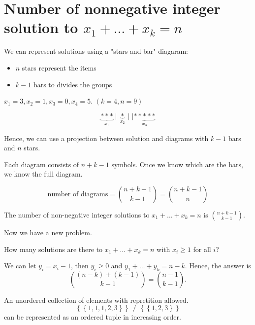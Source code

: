 \section{Number of nonnegative integer solution to \(x_1 + \dots + x_k = n\)}
We can represent solutions using a "stars and bar" diagaram:
\begin{itemize}
    \item \(n\) stars represent the items 
    \item \(k-1\) bars to divides the groups  
\end{itemize}
\begin{eg}
    \(x_1 = 3, x_2 = 1, x_3 = 0, x_4 = 5\). \((k=4, n=9)\)  
\end{eg}
\begin{explanation}
    \[
        \underbrace{* * *}_{x_1} \mid \underbrace{*}_{x_2} \mid \mid \underbrace{* * * * *}_{x_3}
    \]
\end{explanation}

Hence, we can use a projection between solution and diagrams with \(k-1\) bars and \(n\) stars. 

Each diagram consists of \(n + k - 1\) symbols. Once we know which are the bars, we know the full diagram. 

\[
    \text{number of diagrams} = \binom{n + k - 1}{k - 1} = \binom{n + k - 1}{n}
\]

\begin{proposition}
    The number of non-negative integer solutions to \(x_1 + \dots + x_k = n\) is \(\binom{n + k - 1}{k - 1}\). 
\end{proposition}
Now we have a new problem. 
\begin{question}
    How many solutions are there to \(x_1 + \dots + x_k = n\) with \(x_i \ge 1\) for all \(i\)?
\end{question}

We can let \(y_i = x_i - 1\), then \(y_i \ge 0\) and \(y_1 + \dots + y_k = n - k\). Hence, the answer is 
\[
    \binom{(n - k) + (k - 1)}{k-1} = \binom{n-1}{k-1}.
\]   

\begin{definition}[Multisets] \label{def: multiset}
    An unordered collection of elements with repretition allowed. 
    \[
        \left\{ \left\{ 1,1,1,2,3 \right\}  \right\} \neq \left\{ \left\{ 1,2,3 \right\}  \right\} 
    \] can be represented as an ordered tuple in increasing order.
\end{definition}

